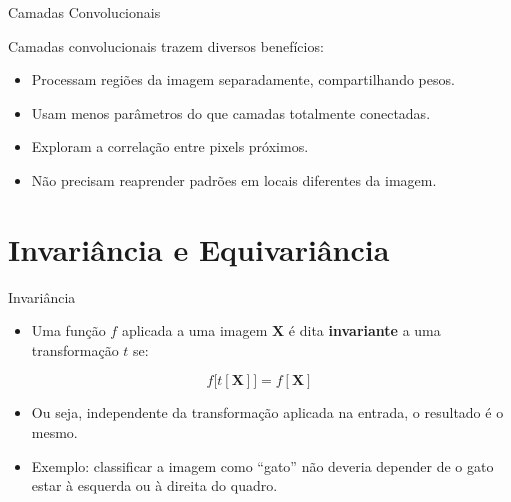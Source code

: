 \documentclass[aspectratio=169,xcolor=dvipsnames]{beamer}
\begin{document}
\begin{frame}{Camadas Convolucionais}
\begin{block}{Camadas convolucionais trazem diversos benefícios:}
\begin{itemize}
    \item Processam regiões da imagem separadamente, compartilhando pesos.
    \item Usam menos parâmetros do que camadas totalmente conectadas.
    \item Exploram a correlação entre pixels próximos.
    \item Não precisam reaprender padrões em locais diferentes da imagem.
\end{itemize}
\end{block}
\end{frame}

\section{Invariância e Equivariância}

\begin{frame}{Invariância}
\begin{itemize}
    \item Uma função $f$ aplicada a uma imagem $\mathbf{X}$ é dita \textbf{invariante} a uma transformação $t$ se:
\end{itemize}
\begin{equation*}
    f\bigl[t[\mathbf{X}]\bigr] = f[\mathbf{X}]
\end{equation*}
\begin{itemize}
    \item Ou seja, independente da transformação aplicada na entrada, o resultado é o mesmo.
    \item Exemplo: classificar a imagem como ``gato'' não deveria depender de o gato estar à esquerda ou à direita do quadro.
\end{itemize}
\end{frame}
\end{document}
